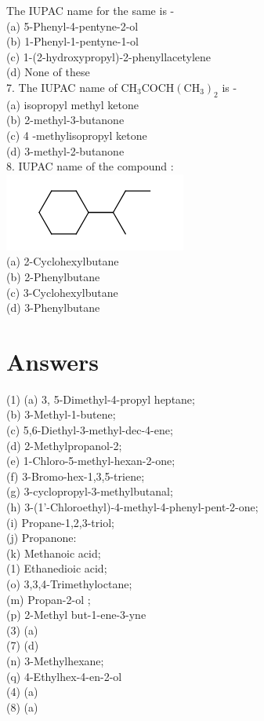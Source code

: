 \documentclass[10pt]{article}
\begin{document}
The IUPAC name for the same is -\\
(a) 5-Phenyl-4-pentyne-2-ol\\
(b) 1-Phenyl-1-pentyne-1-ol\\
(c) 1-(2-hydroxypropyl)-2-phenyllacetylene\\
(d) None of these\\
7. The IUPAC name of $\mathrm{CH}_{3} \mathrm{COCH}\left(\mathrm{CH}_{3}\right)_{2}$ is -\\
(a) isopropyl methyl ketone\\
(b) 2-methyl-3-butanone\\
(c) 4 -methylisopropyl ketone\\
(d) 3-methyl-2-butanone\\
8. IUPAC name of the compound :\\
\includegraphics{smile-1cdba6d7cb7f57f317f049029cf38e67a76f9592}\\
(a) 2-Cyclohexylbutane\\
(b) 2-Phenylbutane\\
(c) 3-Cyclohexylbutane\\
(d) 3-Phenylbutane

\section*{Answers}
(1) (a) 3, 5-Dimethyl-4-propyl heptane;\\
(b) 3-Methyl-1-butene;\\
(c) 5,6-Diethyl-3-methyl-dec-4-ene;\\
(d) 2-Methylpropanol-2;\\
(e) 1-Chloro-5-methyl-hexan-2-one;\\
(f) 3-Bromo-hex-1,3,5-triene;\\
(g) 3-cyclopropyl-3-methylbutanal;\\
(h) 3-(1'-Chloroethyl)-4-methyl-4-phenyl-pent-2-one;\\
(i) Propane-1,2,3-triol;\\
(j) Propanone:\\
(k) Methanoic acid;\\
(1) Ethanedioic acid;\\
(o) 3,3,4-Trimethyloctane;\\
(m) Propan-2-ol ;\\
(p) 2-Methyl but-1-ene-3-yne\\
(3) (a)\\
(7) (d)\\
(n) 3-Methylhexane;\\
(q) 4-Ethylhex-4-en-2-ol\\
(4) (a)\\
(8) (a)
\end{document}
